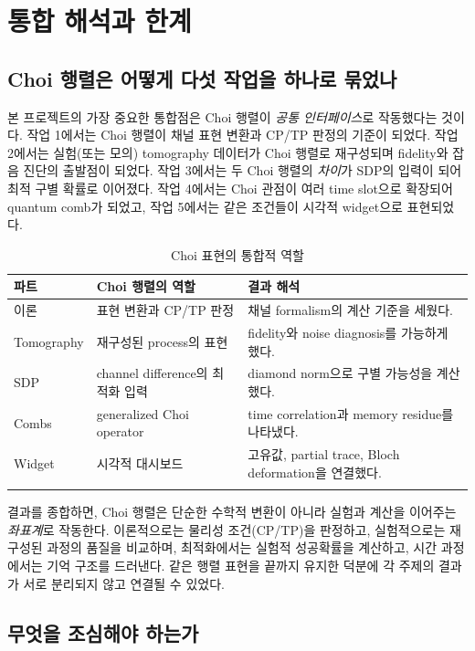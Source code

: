 \documentclass[11pt,a4paper]{article}
\begin{document}
\section{통합 해석과 한계}

\subsection{Choi 행렬은 어떻게 다섯 작업을 하나로 묶었나}

본 프로젝트의 가장 중요한 통합점은 Choi 행렬이 \emph{공통 인터페이스}로 작동했다는 것이다. 작업 1에서는 Choi 행렬이 채널 표현 변환과 CP/TP 판정의 기준이 되었다. 작업 2에서는 실험(또는 모의) tomography 데이터가 Choi 행렬로 재구성되며 fidelity와 잡음 진단의 출발점이 되었다. 작업 3에서는 두 Choi 행렬의 \emph{차이}가 SDP의 입력이 되어 최적 구별 확률로 이어졌다. 작업 4에서는 Choi 관점이 여러 time slot으로 확장되어 quantum comb가 되었고, 작업 5에서는 같은 조건들이 시각적 widget으로 표현되었다.

\begin{longtable}{p{}p{}p{}}
\toprule
파트 & Choi 행렬의 역할 & 결과 해석 \\
\midrule
이론 & 표현 변환과 CP/TP 판정 & 채널 formalism의 계산 기준을 세웠다. \\
Tomography & 재구성된 process의 표현 & fidelity와 noise diagnosis를 가능하게 했다. \\
SDP & channel difference의 최적화 입력 & diamond norm으로 구별 가능성을 계산했다. \\
Combs & generalized Choi operator & time correlation과 memory residue를 나타냈다. \\
Widget & 시각적 대시보드 & 고유값, partial trace, Bloch deformation을 연결했다. \\
\bottomrule
\caption{Choi 표현의 통합적 역할}
\label{tab:integration}
\end{longtable}

결과를 종합하면, Choi 행렬은 단순한 수학적 변환이 아니라 실험과 계산을 이어주는 \emph{좌표계}로 작동한다. 이론적으로는 물리성 조건(CP/TP)을 판정하고, 실험적으로는 재구성된 과정의 품질을 비교하며, 최적화에서는 실험적 성공확률을 계산하고, 시간 과정에서는 기억 구조를 드러낸다. 같은 행렬 표현을 끝까지 유지한 덕분에 각 주제의 결과가 서로 분리되지 않고 연결될 수 있었다.

\subsection{무엇을 조심해야 하는가}
\end{document}
